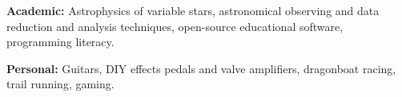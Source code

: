 \documentclass[]{friggeri-cv} %
\begin{document}
\textbf{Academic:} Astrophysics of variable stars, astronomical observing and data reduction and analysis techniques, open-source educational software, programming literacy.

\textbf{Personal:} Guitars, DIY effects pedals and valve amplifiers, dragonboat racing, trail running, gaming.



%
\end{document}
